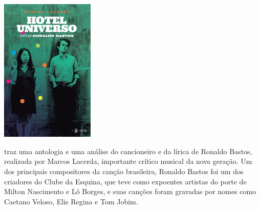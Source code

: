 \begin{center}
\hspace*{-4cm}
\hspace*{4cm}\includegraphics[width=44.6mm]{./imgs/universo.jpg}
\end{center}

\hspace*{-7cm}\hrulefill\hspace*{-7cm}

\medskip

 traz uma antologia e uma análise do cancioneiro e da lírica de Ronaldo Bastos, realizada por Marcos Lacerda, importante crítico musical da nova geração. Um dos principais compositores da canção brasileira, Ronaldo Bastos foi um dos criadores do Clube da Esquina, que teve como expoentes artistas do porte de Milton Nascimento e Lô Borges, e suas canções foram gravadas por nomes como Caetano Veloso, Elis Regina e Tom Jobim.

\vfill

\hspace*{-.4cm}\begin{minipage}[c]{1\linewidth}
\small{
{}}
\end{minipage}

